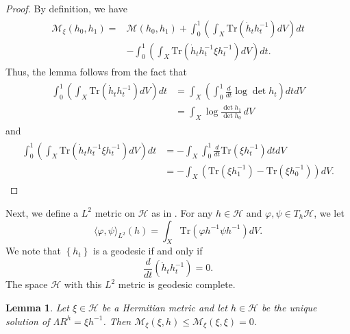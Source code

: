 \documentclass[11pt]{amsart}
\newtheorem{lemma}{Lemma}[section]
\numberwithin{equation}{section}
\theoremstyle{remark}
\renewcommand{\phi}{\varphi}
\newcommand{\M}{{\mathcal M}}
\newcommand{\hh}{{\mathcal H}}
\newcommand{\lb}{\left (}
\newcommand{\rb}{\right )}
\newcommand{\lfb}{\left \{}
\newcommand{\rfb}{\right \}}
\newcommand{\tr}{\text{Tr}}
\begin{document}
\begin{proof}

By definition, we have
\begin{align*}
\begin{split}
\M_{\xi}(h_0,h_1)=& \M(h_0,h_1)+ \int_0^1 \lb \int_X \tr  \lb \dot  h_t h_t^{-1} \rb dV\rb dt\\
& -\int_0^1 \lb \int_X \tr  \lb \dot h_t h_t^{-1} \xi h_t^{-1}\rb dV\rb dt.
\end{split}
\end{align*}
Thus, the lemma follows from the fact that
\begin{align*}
\begin{split}
\int_0^1 \lb \int_X \tr  \lb\dot h_t h_t^{-1} \rb dV\rb dt & =\int_X \lb \int_0^1\frac{d}{dt}\log\det h_t\rb dt dV\\
& =\int_X \log\frac{\det h_1}{\det h_0}\, dV
\end{split}
\end{align*}
and
\begin{align*}
\begin{split}
\int_0^1 \lb \int_X \tr  \lb \dot h_t h_t^{-1}\xi h_t^{-1}\rb dV\rb dt &=  -\int_X \int_0^1\frac{d}{dt}  \tr\lb \xi h_t^{-1}\rb dt dV\\
&=-\int_X \lb \tr\lb \xi h_1^{-1}\rb- \tr\lb \xi h_0^{-1}\rb\rb dV.
\end{split}
\end{align*}
\end{proof}

Next, we define a  $L^2$ metric on $\hh$ as in \cite{ko}. For any $h\in\hh$ and $\phi, \psi\in T_h\hh$,  we let
\[
\langle \phi, \psi\rangle_{L^2}(h)=\int_X \tr\lb \phi h^{-1}\psi h^{-1}\rb dV.
\]
We note that $\lfb h_t\rfb$ is a geodesic if and only if \[\frac{d}{dt}\lb \dot h_t h_t^{-1} \rb=0.\]
The space $\hh$ with this $L^2$ metric is geodesic complete.

\begin{lemma}\label{d50}
Let $\xi\in\hh$ be a Hermitian metric and let $h\in\hh$ be the unique solution of $\Lambda R^h=\xi h^{-1}$. Then $\M_\xi(\xi,h)\leq \M_\xi (\xi, \xi)=0$.
\end{lemma}
\end{document}
